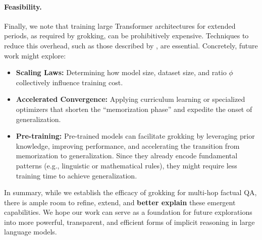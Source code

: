 \paragraph{Feasibility.}
Finally, we note that training large Transformer architectures for extended periods, as required by grokking, can be prohibitively expensive. Techniques to reduce this overhead, such as those described by \citet{lee_grokfast_2024}, are essential. Concretely, future work might explore:
\begin{itemize}
    \item \textbf{Scaling Laws:} Determining how model size, dataset size, and ratio \(\phi\) collectively influence training cost.
    \item \textbf{Accelerated Convergence:} Applying curriculum learning or specialized optimizers that shorten the “memorization phase” and expedite the onset of generalization.
    \item \textbf{Pre-training:} Pre-trained models can facilitate grokking by leveraging prior knowledge, improving performance, and accelerating the transition from memorization to generalization. Since they already encode fundamental patterns (e.g., linguistic or mathematical rules), they might require less training time to achieve generalization.
\end{itemize}

\vspace{0.5em}
\noindent
In summary, while we establish the efficacy of grokking for multi-hop factual QA, there is ample room to refine, extend, and \textbf{better explain} these emergent capabilities. We hope our work can serve as a foundation for future explorations into more powerful, transparent, and efficient forms of implicit reasoning in large language models.

